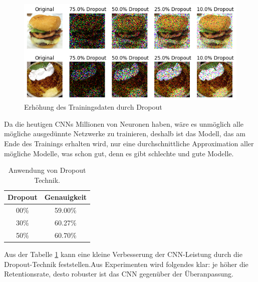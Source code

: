 \documentclass[12pt,a4paper]{scrartcl}
\numberwithin{equation}{section}
\begin{document}
	\begin{figure}[h!]
		\centering
		\includegraphics[width=\textwidth]{model}
		\caption{Erhöhung des Trainingsdaten durch Dropout}
		\label{fig:DropoutDataAugmentation}
	\end{figure}
	
Da die heutigen \acsp{CNN} Millionen von Neuronen haben, wäre es unmöglich alle mögliche ausgedünnte Netzwerke zu trainieren, deshalb ist das Modell, das am Ende des Trainings erhalten wird, nur eine durchschnittliche Approximation aller mögliche Modelle, was schon gut, denn es gibt schlechte und gute Modelle.
	\begin{table}[h!]
		\centering
		\begin{tabular}{|c|c|}
			\hline
			Dropout & Genauigkeit \\ \hline
			00\% & 59.00\% \\ \hline
			30\% & 60.27\% \\ \hline
			50\% & 60.70\% \\ \hline
		\end{tabular}
	\caption{Anwendung von Dropout Technik.}
	\label{tab:dropout}
	\end{table}

Aus der Tabelle \ref{tab:dropout} kann eine kleine Verbesserung der CNN-Leistung durch die Dropout-Technik feststellen.Aus Experimenten wird folgendes klar: je höher die Retentionsrate, desto robuster ist das CNN gegenüber der Überanpassung.

\end{document}
